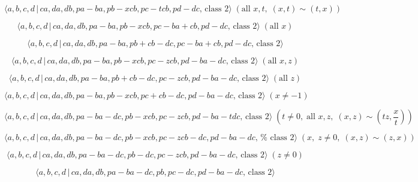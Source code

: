 \documentclass[10pt]{article}
\begin{document}
\begin{equation}
\langle a,b,c,d\,|\,ca,da,db,pa-ba,pb-xcb,pc-tcb,pd-dc,\,\text{class }%
2\rangle \;(\text{all }x,t,\;(x,t)\sim (t,x))  \tag{7.3180}
\end{equation}

\begin{equation}
\langle a,b,c,d\,|\,ca,da,db,pa-ba,pb-xcb,pc-ba+cb,pd-dc,\,\text{class }%
2\rangle \;(\text{all }x)  \tag{7.3181}
\end{equation}

\begin{equation}
\langle a,b,c,d\,|\,ca,da,db,pa-ba,pb+cb-dc,pc-ba+cb,pd-dc,\,\text{class }%
2\rangle  \tag{7.3182}
\end{equation}

\begin{equation}
\langle a,b,c,d\,|\,ca,da,db,pa-ba,pb-xcb,pc-zcb,pd-ba-dc,\,\text{class }%
2\rangle \;(\text{all }x,z)  \tag{7.3183}
\end{equation}

\begin{equation}
\langle a,b,c,d\,|\,ca,da,db,pa-ba,pb+cb-dc,pc-zcb,pd-ba-dc,\,\text{class }%
2\rangle \;(\text{all }z)  \tag{7.3184}
\end{equation}

\begin{equation}
\langle a,b,c,d\,|\,ca,da,db,pa-ba,pb-xcb,pc+cb-dc,pd-ba-dc,\,\text{class }%
2\rangle \;(x \neq -1)  \tag{7.3185}
\end{equation}

\begin{equation}
\langle a,b,c,d\,|\,ca,da,db,pa-ba-dc,pb-xcb,pc-zcb,pd-ba-tdc,\,\text{class }%
2\rangle \;(t\neq 0,\;\text{all }x,z,\;(x,z)\sim (tz,\frac{x}{t})) 
\tag{7.3186}
\end{equation}

\begin{equation}
\langle a,b,c,d\,|\,ca,da,db,pa-ba-dc,pb-xcb,pc-zcb-dc,pd-ba-dc,\,\text{%
class }2\rangle \;(x,\;z\neq 0,\;(x,z)\sim (z,x))  \tag{7.3187}
\end{equation}

\begin{equation}
\langle a,b,c,d\,|\,ca,da,db,pa-ba-dc,pb-dc,pc-zcb,pd-ba-dc,\,\text{class }%
2\rangle \;(z \neq 0)  \tag{7.3188}
\end{equation}

\begin{equation}
\langle a,b,c,d\,|\,ca,da,db,pa-ba-dc,pb,pc-dc,pd-ba-dc,\,\text{class }%
2\rangle  \tag{7.3189}
\end{equation}
\end{document}
